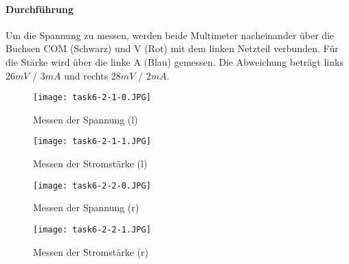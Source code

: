\paragraph{Durchführung}
Um die Spannung zu messen, werden beide Multimeter nacheinander über die Buchsen COM (Schwarz) und V (Rot) mit dem linken Netzteil verbunden. Für die Stärke wird über die linke A (Blau) gemessen. Die Abweichung beträgt links $26mV$ / $3mA$ und rechts $28mV$ / $2mA$.

\begin{figure}
	\begin{minipage}[c]{0.49\textwidth}
		\texttt{[image: task6-2-1-0.JPG]}
		\caption{Messen der Spannung (l)}
		\label{task6-2-1-0}
	\end{minipage}
	\begin{minipage}[c]{0.49\textwidth}
		\texttt{[image: task6-2-1-1.JPG]}
		\caption{Messen der Stromstärke (l)}
		\label{task6-2-1-1}
	\end{minipage}
\end{figure}

\begin{figure}
	\begin{minipage}[c]{0.49\textwidth}
		\texttt{[image: task6-2-2-0.JPG]}
		\caption{Messen der Spannung (r)}
		\label{task6-2-2-0}
	\end{minipage}
	\begin{minipage}[c]{0.49\textwidth}
		\texttt{[image: task6-2-2-1.JPG]}
		\caption{Messen der Stromstärke (r)}
		\label{task6-2-2-1}
	\end{minipage}
\end{figure}